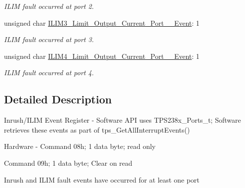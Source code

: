 \begin{DoxyCompactItemize}
\begin{DoxyCompactList}\small\item\em I\-L\-I\-M fault occurred at port 2. \end{DoxyCompactList}\item 
unsigned char \hyperlink{struct_t_p_s238_x___inrush___i_l_i_m___event___register__t_a3810ac1638f0e8a19243a2e7159048b8}{I\-L\-I\-M3\-\_\-\-Limit\-\_\-\-Output\-\_\-\-Current\-\_\-\-Port\-\_\-\_\-\-Event}\-: 1
\begin{DoxyCompactList}\small\item\em I\-L\-I\-M fault occurred at port 3. \end{DoxyCompactList}\item 
unsigned char \hyperlink{struct_t_p_s238_x___inrush___i_l_i_m___event___register__t_a3ef5c63d20211197037ce86d5d1f0600}{I\-L\-I\-M4\-\_\-\-Limit\-\_\-\-Output\-\_\-\-Current\-\_\-\-Port\-\_\-\_\-\-Event}\-: 1
\begin{DoxyCompactList}\small\item\em I\-L\-I\-M fault occurred at port 4. \end{DoxyCompactList}\end{DoxyCompactItemize}


\subsection{Detailed Description}
Inrush/\-I\-L\-I\-M Event Register -\/ Software A\-P\-I uses T\-P\-S238x\-\_\-\-Ports\-\_\-t; Software retrieves these events as part of tps\-\_\-\-Get\-All\-Interrupt\-Events() \par
 Hardware -\/ Command 08h; 1 data byte; read only \par

\begin{DoxyItemize}
\item Command 09h; 1 data byte; Clear on read \par
\par
 Inrush and I\-L\-I\-M fault events have occurred for at least one port 
\end{DoxyItemize}

